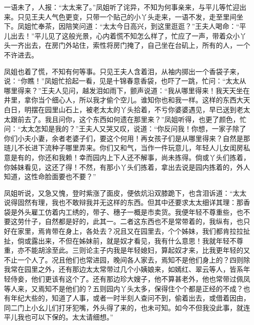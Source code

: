 \documentclass[12pt,oneside]{book}
\begin{document}
一语未了，人报：“太太来了。”凤姐听了诧异，不知为何事亲来，与平儿等忙迎出来。只见王夫人气色更变，只带一个贴己的小丫头走来，一语不发，走至里间坐下。凤姐忙奉茶，因陪笑问道：“太太今日高兴，到这里逛逛？”王夫人喝命：“平儿出去！”平儿见了这般光景，心内着慌不知怎么样了，忙应了一声，带着众小丫头一齐出去，在房门外站住，索性将房门掩了，自己坐在台矶上，所有的人，一个不许进去。

凤姐也着了慌，不知有何等事。只见王夫人含着泪，从袖内掷出一个香袋子来，说：“你瞧！”凤姐忙拾起一看，见是十锦春意香袋，也吓了一跳，忙问：“太太从哪里得来？”王夫人见问，越发泪如雨下，颤声说道：“我从哪里得来！我天天坐在井里，拿你当个细心人，所以我才偷个空儿。谁知你也和我一样。这样的东西大天白日，明摆在园里山石上，被老太太的丫头拾着，不亏你婆婆遇见，早已送到老太太跟前去了。我且问你，这个东西如何遗在那里来？”凤姐听得，也更了颜色，忙问：“太太怎知是我的？”王夫人又哭又叹，说道：“你反问我！你想，一家子除了你们小夫小妻，余者老婆子们，要这个何用！再女孩子们是从哪里得来？自然是那琏儿不长进下流种子哪里弄来。你们又和气，当作一件玩意儿，年轻人儿女闺房私意是有的，你还和我赖！幸而园内上下人还不解事，尚未拣得。倘或丫头们拣着，你姊妹看见，这还了得！不然，有那小丫头们拣着，拿出去说是园内拣着的，外人知道，这性命脸面要也不要？”

凤姐听说，又急又愧，登时紫涨了面皮，便依炕沿双膝跪下，也含泪诉道：“太太说得固然有理，我也不敢辩我并无这样的东西。但其中还要求太太细详其理：那香袋是外头雇工仿着内工绣的，带子、穗子一概是市卖货。我便年轻不尊重些，也不要这劳什子，自然都是好的，此其一。二者这东西也不是常带着的，我纵有，也只好在家里，焉肯带在身上，各处去？况且又在园里去，个个姊妹，我们都肯拉拉扯扯，倘或露出来，不但在姊妹前，就是奴才看见，我有什么意思！我就年轻不尊重，亦不能胡涂至此。三则论主子内我是年轻媳妇，算起奴才来，比我更年轻的又不止一个人了。况且他们也常进园，晚间各人家去，焉知不是他们身上的？四则除我常在园里之外，还有那边太太常带过几个小姨娘来，如嫣红、翠云等人，皆系年轻侍妾，他们更该有这个了。还有那边珍大嫂子，他不算甚老外，他也常带过佩凤等人来，又焉知不是他们的？五则园内丫头太多，保得住个个都是正经的不成？也有年纪大些的，知道了人事，或者一时半刻人查问不到，偷着出去，或借着因由，同二门上小幺儿们打牙犯嘴，外头得了来的，也未可知。如今不但我没此事，就连平儿我也可以下保的。太太请细想。”
\end{document}
